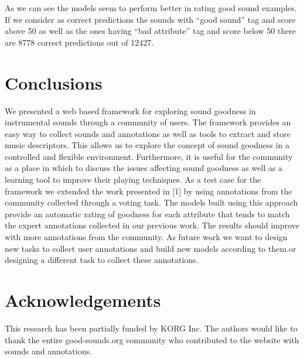 \documentclass{article}
\begin{document}
As we can see the models seem to perform better in rating good sound examples. If we consider as correct predictions the sounds with “good sound” tag and score above 50 as well as the ones having “bad attribute” tag and score below 50 there are 8778 correct predictions out of 12427. 

\section{Conclusions}
We presented a web based framework for exploring sound goodness in instrumental sounds through a community of users. The framework provides an easy way to collect sounds and annotations as well as tools to extract and store music descriptors. This allows us to explore the concept of sound goodness in a controlled and flexible environment. Furthermore, it is useful for the community as a place in which to discuss the issues affecting sound goodness as well as a learning tool to improve their playing techniques. 
As a test case for the framework we extended the work presented in [1] by using annotations from the community collected through a voting task. The models built using this approach provide an automatic rating of goodness for each attribute that tends to match the expert annotations collected in our previous work. The results should improve with more annotations from the community.
As future work we want to design new tasks to collect user annotations and build new models according to them.or designing a different task to collect these annotations. 

\section{Acknowledgements}
This research has been partially funded by KORG Inc. The authors would like to thank the entire good-sounds.org community who contributed to the website with sounds and annotations.

%
\end{document}
